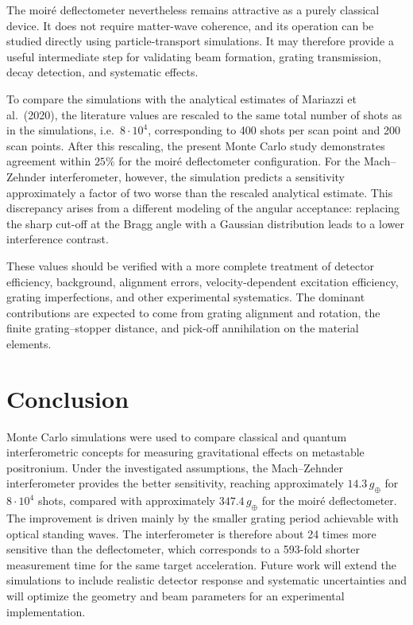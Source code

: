 \documentclass[10pt,twocolumn]{article}
\begin{document}
The moir\'e deflectometer nevertheless remains attractive as a purely classical device. It does not require matter-wave coherence, and its operation can be studied directly using particle-transport simulations. It may therefore provide a useful intermediate step for validating beam formation, grating transmission, decay detection, and systematic effects.

To compare the simulations with the analytical estimates of Mariazzi et al.\ (2020)\cite{Mariazzi_Caravita_Doser_Nebbia_Brusa_2020}, the literature values are rescaled to the same total number of shots as in the simulations, i.e.\ $8\cdot10^4$, corresponding to 400 shots per scan point and 200 scan points. After this rescaling, the present Monte Carlo study demonstrates agreement within $25\%$ for the moir\'e deflectometer configuration. For the Mach--Zehnder interferometer, however, the simulation predicts a sensitivity approximately a factor of two worse than the rescaled analytical estimate. This discrepancy arises from a different modeling of the angular acceptance: replacing the sharp cut-off at the Bragg angle with a Gaussian distribution leads to a lower interference contrast.

These values should be verified with a more complete treatment of detector efficiency, background, alignment errors, velocity-dependent excitation efficiency, grating imperfections, and other experimental systematics. The dominant contributions are expected to come from grating alignment and rotation, the finite grating--stopper distance, and pick-off annihilation on the material elements.

\section{Conclusion}

Monte Carlo simulations were used to compare classical and quantum interferometric concepts for measuring gravitational effects on metastable positronium. Under the investigated assumptions, the Mach--Zehnder interferometer provides the better sensitivity, reaching approximately $14.3\,g_\oplus$ for $8\cdot10^4$ shots, compared with approximately $347.4\,g_\oplus$ for the moir\'e deflectometer. The improvement is driven mainly by the smaller grating period achievable with optical standing waves. The interferometer is therefore about 24 times more sensitive than the deflectometer, which corresponds to a 593-fold shorter measurement time for the same target acceleration. Future work will extend the simulations to include realistic detector response and systematic uncertainties and will optimize the geometry and beam parameters for an experimental implementation.
\end{document}
